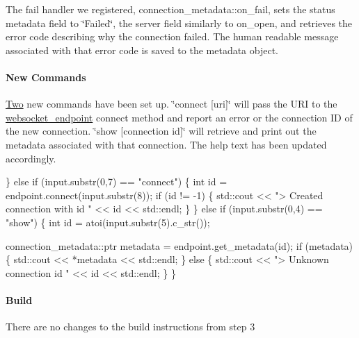 The fail handler we registered, {\ttfamily connection\+\_\+metadata\+::on\+\_\+fail}, sets the status metadata field to \char`\"{}\+Failed\char`\"{}, the server field similarly to {\ttfamily on\+\_\+open}, and retrieves the error code describing why the connection failed. The human readable message associated with that error code is saved to the metadata object.

\paragraph*{New Commands}

\mbox{\hyperlink{struct_two}{Two}} new commands have been set up. \char`\"{}connect \mbox{[}uri\mbox{]}\char`\"{} will pass the U\+RI to the {\ttfamily \mbox{\hyperlink{classwebsocket__endpoint}{websocket\+\_\+endpoint}}} connect method and report an error or the connection ID of the new connection. \char`\"{}show \mbox{[}connection id\mbox{]}\char`\"{} will retrieve and print out the metadata associated with that connection. The help text has been updated accordingly.


\begin{DoxyCode}
\} \textcolor{keywordflow}{else} \textcolor{keywordflow}{if} (input.substr(0,7) == \textcolor{stringliteral}{"connect"}) \{
    \textcolor{keywordtype}{int} \textcolor{keywordtype}{id} = endpoint.connect(input.substr(8));
    \textcolor{keywordflow}{if} (\textcolor{keywordtype}{id} != -1) \{
        std::cout << \textcolor{stringliteral}{"> Created connection with id "} << \textcolor{keywordtype}{id} << std::endl;
    \}
\} \textcolor{keywordflow}{else} \textcolor{keywordflow}{if} (input.substr(0,4) == \textcolor{stringliteral}{"show"}) \{
    \textcolor{keywordtype}{int} \textcolor{keywordtype}{id} = atoi(input.substr(5).c\_str());

    connection\_metadata::ptr metadata = endpoint.get\_metadata(\textcolor{keywordtype}{id});
    \textcolor{keywordflow}{if} (metadata) \{
        std::cout << *metadata << std::endl;
    \} \textcolor{keywordflow}{else} \{
        std::cout << \textcolor{stringliteral}{"> Unknown connection id "} << \textcolor{keywordtype}{id} << std::endl;
    \}
\}
\end{DoxyCode}


\paragraph*{Build}

There are no changes to the build instructions from step 3

